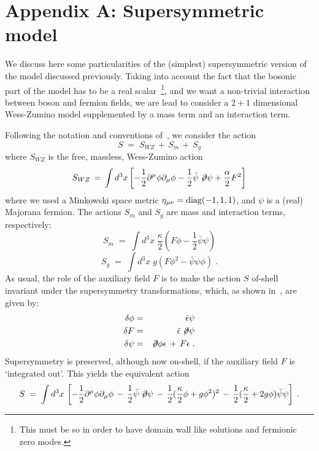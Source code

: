 \documentclass[a4paper,12pt]{article}
\begin{document}
\section*{Appendix A: Supersymmetric model}
We discuss here some particularities of the (simplest) supersymmetric 
version of the model discussed previously. Taking into account the 
fact that the bosonic part of the model has to be a real 
scalar~\footnote{This must be so in order to have domain wall like
solutions and fermionic zero modes.}, and we want a non-trivial 
interaction between boson and fermion fields, we are lead to consider 
a \mbox{$2+1$} dimensional Wess-Zumino model 
supplemented by a mass term and an interaction term. 

Following the notation and conventions of~\cite{susy}, we consider
the action 
\begin{equation}\label{eq:defssusy}
S\;=\; S_{WZ} \,+\, S_m \,+\, S_g
\end{equation} 
where $S_{WZ}$ is the free, massless, Wess-Zumino action
\begin{equation}\label{eq:defswz}
S_{WZ}\,=\, \int d^3x \left[ -\frac{1}{2} \partial^\mu \phi 
\partial_\mu \phi - \frac{1}{2} {\bar \psi} \not \!\partial \psi 
+ \frac{\alpha}{2} F^2 \right]
\end{equation}
where we used a Minkowski space metric \mbox{$\eta_{\mu\nu}={\rm diag}(-1,1,1)$},
and $\psi$ is a (real) Majorana fermion.  
The actions $S_m$ and $S_g$ are mass and interaction terms,
respectively:
$$
S_m\;=\; \int d^3x \; \frac{\kappa}{2} 
\left( F \phi - \frac{1}{2} {\bar\psi}\psi \right)
$$
\begin{equation}
S_g\;=\; \int d^3x\; g \left( F \phi^2 - {\bar\psi}\psi \phi \right) \;.
\end{equation}
As usual, the role of the auxiliary field $F$ is to make the action $S$ 
of-shell invariant under the supersymmetry transformations, which, as shown 
in~\cite{susy}, are given by: 
\begin{eqnarray}\label{eq:susytrans}
\delta \phi &=& {\bar\epsilon} \psi \nonumber\\
\delta F &=& {\bar\epsilon} \not \! \partial \psi  \nonumber\\
\delta\psi &=& \not\! \partial \phi \epsilon \,+\, F \epsilon \;.
\end{eqnarray}
Supersymmetry is preserved, although now on-shell, if the auxiliary field 
$F$ is `integrated out'. This yields the equivalent action
\begin{equation}
S\;=\; \int d^3x \, \left[ -\frac{1}{2} \partial^\mu \phi 
\partial_\mu \phi \,-\, \frac{1}{2} {\bar \psi} \not \!\partial \psi 
\,-\,\frac{1}{2} (\frac{\kappa}{2} \phi + g \phi^2)^2 \,-\, 
\frac{1}{2} (\frac{\kappa}{2} + 2 g \phi) {\bar\psi} \psi \right] \;.
\end{equation}
\end{document}
